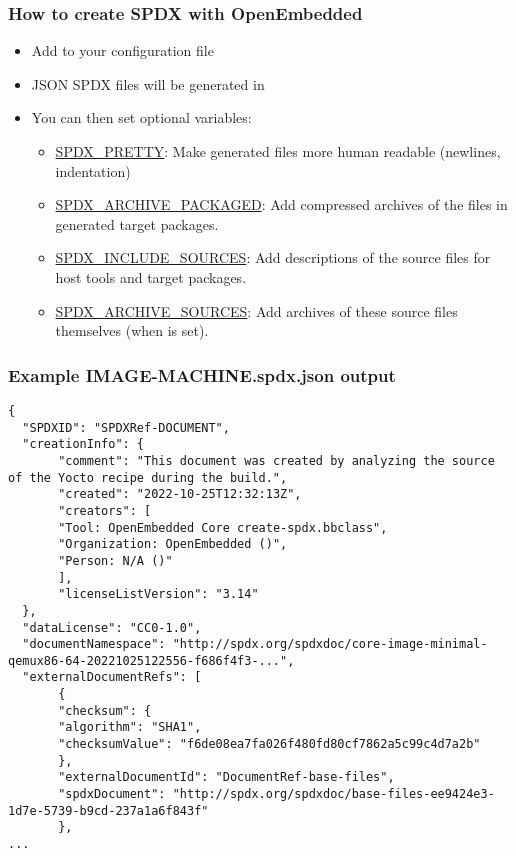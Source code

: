 \begin{frame}[fragile]
  \frametitle{How to create SPDX with OpenEmbedded}
  \begin{itemize}
     \item Add  to your configuration file
     \item JSON SPDX files will be generated in 
     \item You can then set optional variables:
           \begin{itemize}
	      \item \href{https://docs.yoctoproject.org/ref-manual/variables.html\#term-SPDX_PRETTY}{SPDX\_PRETTY}:
		    Make generated files more human readable (newlines, indentation)
	      \item \href{https://docs.yoctoproject.org/ref-manual/variables.html\#term-SPDX_ARCHIVE_PACKAGED}{SPDX\_ARCHIVE\_PACKAGED}:
		    Add compressed archives of the files in generated target packages.
	      \item \href{https://docs.yoctoproject.org/ref-manual/variables.html\#term-SPDX_INCLUDE_SOURCES}{SPDX\_INCLUDE\_SOURCES}:
		    Add descriptions of the source files for host tools and target packages.
	      \item \href{https://docs.yoctoproject.org/ref-manual/variables.html#term-SPDX_ARCHIVE_SOURCES}{SPDX\_ARCHIVE\_SOURCES}:
		    Add archives of these source files themselves (when  is set).
           \end{itemize}
  \end{itemize}
\end{frame}

\begin{frame}[fragile]
  \frametitle{Example IMAGE-MACHINE.spdx.json output}
  \begin{block}{}
    \fontsize{7}{7}\selectfont
    \begin{verbatim}
{
  "SPDXID": "SPDXRef-DOCUMENT",
  "creationInfo": {
       "comment": "This document was created by analyzing the source of the Yocto recipe during the build.",
       "created": "2022-10-25T12:32:13Z",
       "creators": [
       "Tool: OpenEmbedded Core create-spdx.bbclass",
       "Organization: OpenEmbedded ()",
       "Person: N/A ()"
       ],
       "licenseListVersion": "3.14"
  },
  "dataLicense": "CC0-1.0",
  "documentNamespace": "http://spdx.org/spdxdoc/core-image-minimal-qemux86-64-20221025122556-f686f4f3-...",
  "externalDocumentRefs": [
       {
       "checksum": {
       "algorithm": "SHA1",
       "checksumValue": "f6de08ea7fa026f480fd80cf7862a5c99c4d7a2b"
       },
       "externalDocumentId": "DocumentRef-base-files",
       "spdxDocument": "http://spdx.org/spdxdoc/base-files-ee9424e3-1d7e-5739-b9cd-237a1a6f843f"
       },
...
    \end{verbatim}
  \end{block}
\end{frame}

